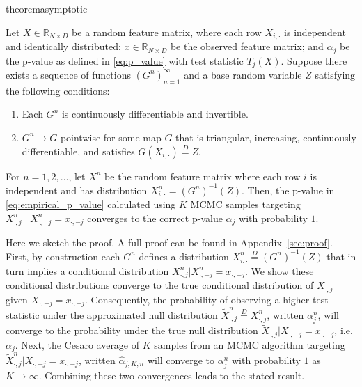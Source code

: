 \documentclass{article}
\begin{document}
  \begin{restatable}{theorem}{asymptotic}\label{thm:asymptotic}
\begin{samepage}
  Let $X \in \mathbb R_{N \times D}$ be a random feature matrix, where each row $X_{i, \cdot}$ is independent and identically distributed; $x \in \mathbb R_{N \times D}$ be the observed feature matrix;
  and $\alpha_j$ be the p-value as defined in \cref{eq:p_value} with test statistic $T_j(X)$.
  Suppose there exists a sequence of functions $\left( G^{n} \right)_{n = 1}^\infty$ and a base random variable $Z$ satisfying the following conditions:
  \begin{enumerate}
    \item Each $G^n$ is continuously differentiable and invertible.
    \item $G^n \to G$ pointwise for some map $G$ that is triangular, increasing, continuously differentiable, and satisfies $G(X_{i, \cdot}) \overset D = Z$.
\end{enumerate}
For $n=1, 2, \dots$, let $X^n$ be the random feature matrix where each row $i$ is independent and has distribution $X^n_{i, \cdot} = (G^n)^{-1} (Z)$.
Then, the p-value in \cref{eq:empirical_p_value} calculated using $K$ MCMC samples targeting $X_{\cdot, j}^n \mid X_{\cdot, -j}^n = x_{\cdot, -j}$ converges to the correct p-value $\alpha_j$ with probability $1$.
\end{samepage}
\end{restatable}
Here we sketch the proof. A full proof can be found in Appendix~\ref{sec:proof}.
First, by construction each $G^n$ defines a distribution $X^n_{i, \cdot} \overset D = (G^n)^{-1}(Z)$ that in turn implies a conditional distribution $X^n_{\cdot, j} | X^n_{\cdot, -j} = x_{\cdot, -j}$.
We show these conditional distributions converge to the true conditional distribution of $X_{\cdot, j}$ given $X_{\cdot, -j} = x_{\cdot, -j}$.
Consequently, the probability of observing a higher test statistic under the approximated null distribution $\tilde X_{\cdot, j}^n \overset D = X_{\cdot, j}^n$, written $\alpha_j^n$, will converge to the probability under the true null distribution $\tilde X_{\cdot, j} | X_{\cdot, -j} = x_{\cdot, -j}$, i.e. $\alpha_{j}$.
Next, the Cesaro average of $K$ samples from an MCMC algorithm targeting $\tilde X_{\cdot, j}^n | X_{\cdot, -j}= x_{\cdot, -j}$, written $\hat \alpha_{j, K, n}$ will converge to $\alpha_j^n$ with probability $1$ as $K \to \infty$.
Combining these two convergences leads to the stated result.
\end{document}
